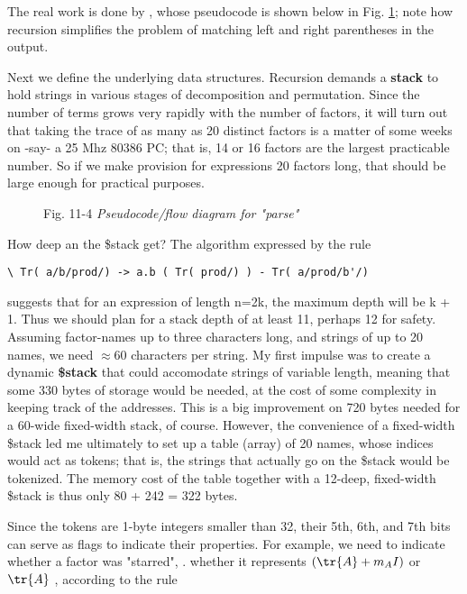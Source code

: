 The real work is done by , whose pseudocode is shown below in Fig. \ref{fig:11_04}; note how recursion simplifies the problem of matching left and right parentheses in the output.

Next we define the underlying data structures. Recursion demands a \textbf{stack} to hold strings in various stages of decomposition and permutation. Since the number of terms grows very rapidly with the number of factors, it will turn out that taking the trace of as many as 20 distinct factors is a matter of some weeks on -say- a 25 Mhz 80386 PC; that is, 14 or 16 factors are the largest practicable number. So if we make provision for expressions 20 factors long, that should be large enough for practical purposes.

\begin{figure}
    \caption{Fig. 11-4 \textit{Pseudocode/flow diagram for "parse"}}
    \label{fig:11_04}
\end{figure}

How deep an the \$stack get? The algorithm expressed by the rule

\begin{verbatim}
\ Tr( a/b/prod/) -> a.b ( Tr( prod/) ) - Tr( a/prod/b'/)
\end{verbatim}

suggests that for an expression of length n=2k, the maximum depth will be k + 1. Thus we should plan for a stack depth of at least 11, perhaps 12 for safety. Assuming factor-names up to three characters long, and strings of up to 20 names, we need $\approx$60 characters per string. My first impulse was to create a dynamic \textbf{\$stack} that could accomodate strings of variable length, meaning that some 330 bytes of storage would be needed, at the cost of some complexity in keeping track of the addresses. This is a big improvement on 720 bytes needed for a 60-wide fixed-width stack, of course. However, the convenience of a fixed-width \$stack led me ultimately to set up a table (array) of 20 names, whose indices would act as tokens; that is, the strings that actually go on the \$stack would be tokenized. The memory cost of the table together with a 12-deep, fixed-width \$stack is thus only 80 + 242 = 322 bytes.

Since the tokens are 1-byte integers smaller than 32, their 5th, 6th, and 7th bits can serve as flags to indicate their properties. For example, we need to indicate whether a factor was "starred", \ie. whether it represents $(\tr{A} + m_{A}I)$ or $\tr{A}$ , according to the rule

